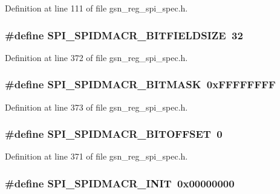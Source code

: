 Definition at line 111 of file gsn\_\-reg\_\-spi\_\-spec.h.

\hypertarget{a00573_afc70c82bcc821825a2cd32afc693662b}{
\subsubsection[{SPI\_\-SPIDMACR\_\-BITFIELDSIZE}]{\setlength{\rightskip}{0pt plus 5cm}\#define SPI\_\-SPIDMACR\_\-BITFIELDSIZE~32}}
\label{a00573_afc70c82bcc821825a2cd32afc693662b}


Definition at line 372 of file gsn\_\-reg\_\-spi\_\-spec.h.

\hypertarget{a00573_a789032b814d4af832650941924986c0d}{
\subsubsection[{SPI\_\-SPIDMACR\_\-BITMASK}]{\setlength{\rightskip}{0pt plus 5cm}\#define SPI\_\-SPIDMACR\_\-BITMASK~0xFFFFFFFF}}
\label{a00573_a789032b814d4af832650941924986c0d}


Definition at line 373 of file gsn\_\-reg\_\-spi\_\-spec.h.

\hypertarget{a00573_a883a47cfddaef8cb0a07d13ee6c9c3d2}{
\subsubsection[{SPI\_\-SPIDMACR\_\-BITOFFSET}]{\setlength{\rightskip}{0pt plus 5cm}\#define SPI\_\-SPIDMACR\_\-BITOFFSET~0}}
\label{a00573_a883a47cfddaef8cb0a07d13ee6c9c3d2}


Definition at line 371 of file gsn\_\-reg\_\-spi\_\-spec.h.

\hypertarget{a00573_a93c159ed0b647aa50646fc96e01698ea}{
\subsubsection[{SPI\_\-SPIDMACR\_\-INIT}]{\setlength{\rightskip}{0pt plus 5cm}\#define SPI\_\-SPIDMACR\_\-INIT~0x00000000}}
\label{a00573_a93c159ed0b647aa50646fc96e01698ea}


